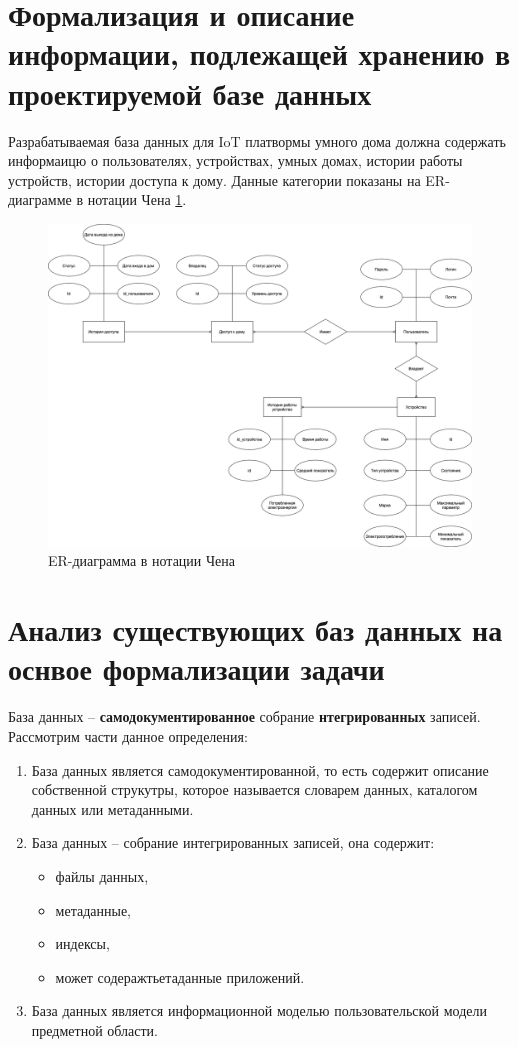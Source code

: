 \section{Формализация и описание информации, подлежащей хранению в проектируемой базе данных}

Разрабатываемая база данных для IoT платвормы умного дома должна содержать информаицю о пользователях, устройствах, умных домах,
истории работы устройств, истории доступа к дому. Данные категории показаны на ER-диаграмме в нотации Чена \ref{img:er}.

\begin{figure}[h]
    \includegraphics[width=0.9\linewidth]{img/er.png}
    \caption{ER-диаграмма в нотации Чена}
    \label{img:er}
\end{figure}
\noindent
\clearpage

\section{Анализ существующих баз данных на оснвое формализации задачи}
База данных -- \textbf{самодокументированное} собрание \textbf{нтегрированных} записей. Рассмотрим части данное определения:
\begin{enumerate}
    \item База данных является самодокументированной, то есть содержит описание собственной струкутры, которое называется 
    словарем данных, каталогом данных или метаданными.
    \item База данных -- собрание интегрированных записей, она содержит:
    \begin{itemize}
        \item файлы данных,
        \item метаданные,
        \item индексы,
        \item может содеражтьетаданные приложений.
    \end{itemize}
    \item База данных является информационной моделью пользовательской модели предметной области.
\end{enumerate}

